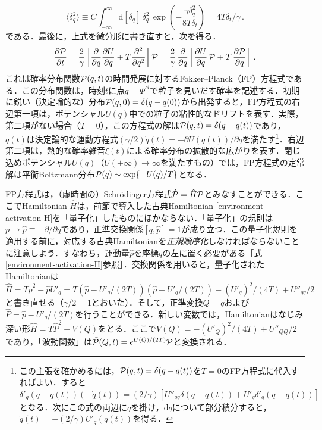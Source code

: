 \documentclass[a4paper,11pt]{ltjsarticle}
\def\d{\mathrm{d}}
\begin{document}
$$\langle \delta_q^2\rangle\equiv C\int_{-\infty}^{\infty}
\d[\delta_q] \, \delta^2_q \,
\exp\left(-\frac{\gamma\delta_q^2}{8T\delta_t}\right) =
4T\delta_t/\gamma\,.$$
である．最後に，上式を微分形に書き直すと，次を得る．
\begin{equation}
{\partial {\cal P}\over\partial t}={2\over \gamma}\left[
 {\partial \over \partial
q}{\partial U\over \partial q}  + T{\partial^2\over \partial
q^2}\right] {\cal P}
 ={2\over \gamma}\,
 {\partial \over \partial
q}\left[ {\partial U\over \partial q}\,{\cal P}  + T\,{\partial
{\cal P}  \over
\partial q}\right]\,.
\end{equation}これは確率分布関数${\cal P}(q,t)$の時間発展に対するFokker--Planck（FP）方程式である．この分布関数は，時刻$t$に点$q=\Phi^{cl}$で粒子を見いだす確率を記述する．初期に鋭い（決定論的な）分布${\cal P}(q,0)= \delta(q-q(0))$から出発すると，FP方程式の右辺第一項は，ポテンシャル$U(q)$中での粒子の粘性的なドリフトを表す．実際，第二項がない場合（$T=0$），この方程式の解は${\cal P}(q,t)= \delta(q-q(t))$であり，$q(t)$は決定論的な運動方程式$(\gamma/2)\dot q(t)=-\partial
U(q(t))/\partial q$を満たす\footnote{この主張を確かめるには，${\cal P}(q,t)= \delta(q-q(t))$を$T=0$のFP方程式に代入すればよい．すると$\delta'_q(q-q(t))(-\dot q(t)) =(2/\gamma)\left[U''_{\!
qq}\delta(q-q(t)) + U'_q\delta'_q(q-q(t))\right]$となる．次にこの式の両辺に$q$を掛け，$\d q$について部分積分すると，$\dot q(t) =
-(2/\gamma)U'_q(q(t))$を得る．}．右辺第二項は，熱的な確率雑音$\xi(t)$による確率分布の拡散的な広がりを表す．閉じ込めポテンシャル$U(q)$（$U(\pm\infty)\to \infty$を満たすもの）では，FP方程式の定常解は平衡Boltzmann分布${\cal P}(q)\sim \exp\{-U(q)/T\}$となる．


FP方程式は，（虚時間の）Schr\"odinger方程式$\dot {\cal P}=\hat H {\cal P}$とみなすことができる．ここでHamiltonian $\hat H$は，前節で導入した古典Hamiltonian \eqref{environment-activation-H}を「量子化」したものにほかならない．「量子化」の規則は$p\to \hat p\equiv -\partial/\partial q$であり，正準交換関係$[q,\hat p]=1$が成り立つ．この量子化規則を適用する前に，対応する古典Hamiltonianを\emph{正規順序化}しなければならないことに注意しよう．すなわち，運動量$\hat p$を座標$q$の左に置く必要がある［式\eqref{environment-activation-H}参照］．交換関係を用いると，量子化されたHamiltonianは
$$\hat H
=T\hat p^2-\hat pU'_q= T\left(\hat p - U'_q/(2T)\right)\left(\hat p
- U'_q/(2T)\right) - (U'_q)^2/(4T) + U''_{qq}/2$$
と書き直せる（$\gamma/2=1$とおいた）．そして，正準変換$Q=q$および$\hat P =\hat p -U'_q/(2T)$を行うことができる．新しい変数では，Hamiltonianはなじみ深い形$\hat H = T\hat P^2 +V(Q)$をとる．ここで$V(Q)= - (U'_Q)^2/(4T) + U''_{QQ}/2$であり，「波動関数」は$\tilde {\cal P}(Q,t) = e^{U(Q)/(2T)} {\cal
P}$と変換される．
\end{document}

